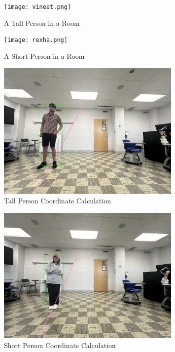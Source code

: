\documentclass[12pt]{report}
\begin{document}
\begin{figure}[H]
    \centering
    \texttt{[image: vineet.png]}
    \caption{A Tall Person in a Room}
    \label{fig: A tall person in a room}
\end{figure}

\begin{figure}[H]
    \centering
    \texttt{[image: rexha.png]}
    \caption{A Short Person in a Room}
    \label{fig:A short person in a room}
\end{figure}

\begin{figure}[H]
    \centering
    \includegraphics[width=0.8\textwidth]{vineet line.jpeg}
    \caption{Tall Person Coordinate Calculation}
    \label{fig:Tall person coordinate calculation}
\end{figure}

\begin{figure}[H]
    \centering
    \includegraphics[width=0.8\textwidth]{rexha line.jpeg}
    \caption{Short Person Coordinate Calculation}
    \label{fig:Short person coordinate calculation}
\end{figure}
\end{document}
